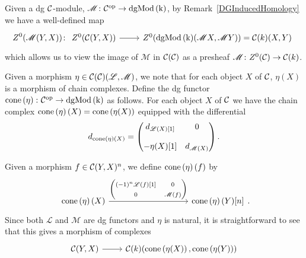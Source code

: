 \documentclass[dissertation.tex]{subfiles}
\begin{document}
Given a dg $\mathcal{C}$-module, $\mathscr{M} \colon \mathcal{C}^\text{op} \rightarrow \operatorname{dgMod\left(k\right)}$, by Remark~\ref{DGInducedHomology} we have a well-defined map
$$Z^0(\mathscr{M}(Y,X)) \colon
\begin{tikzcd}
  Z^0(\C(Y,X)) \arrow{r} & Z^0(\cdg{k}(\mathscr{M}X,\mathscr{M}Y)) = \mathcal{C}(k)(X,Y)
\end{tikzcd}$$
which allows us to view the image of $\mathscr{M}$ in $\mathcal{C}(\mathcal{C})$ as a presheaf $\mathscr{M} \colon Z^0(\mathcal{C}) \to \mathcal{C}(k)$.

\begin{defn}
  Given a morphism $\eta \in \mathcal{C}(\mathcal{C})(\mathscr{L}, \mathscr{M})$, we note that for each object $X$ of $\mathcal{C}$, $\eta(X)$ is a morphism of chain complexes.
  Define the dg functor $\operatorname{cone}\left(\eta\right) \colon \mathcal{C}^\text{op} \rightarrow \operatorname{dgMod\left(k\right)}$ as follows.
  For each object $X$ of $\mathcal{C}$ we have the chain complex $\operatorname{cone}\left(\eta\right)(X) = \operatorname{cone}\left(\eta(X)\right)$ equipped with the differential
  $$d_{\operatorname{cone}\left(\eta\right)(X)} = \left(\begin{matrix}
    d_{\mathscr{L}(X)[1]} & 0\\
    \\
    -\eta(X)[1] & d_{\mathscr{M}(X)}
  \end{matrix}\right).$$

  Given a morphism $f \in \mathcal{C}(Y,X)^n$, we define $\operatorname{cone}\left(\eta\right)(f)$ by
  $$\begin{tikzcd}[ampersand replacement=\&]
    \cone{\eta}(X) \arrow{rrrr}{\left(\begin{matrix}(-1)^n\mathscr{L}(f)[1] & 0\\0 & \mathscr{M}(f)\end{matrix}\right)} \&\&\&\& \cone{\eta}(Y)[n]
  \end{tikzcd}.$$
  Since both $\mathscr{L}$ and $\mathscr{M}$ are dg functors and $\eta$ is natural, it is straightforward to see that this gives a morphism of complexes
  $$\begin{tikzcd}
    \C(Y,X) \arrow{r} & \mathcal{C}(k)(\cone{\eta(X)}, \cone{\eta(Y)})
  \end{tikzcd}$$
\end{defn}
\end{document}
